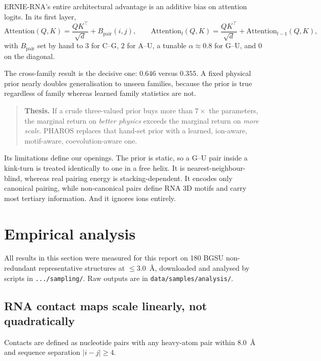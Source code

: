 \documentclass[11pt,a4paper]{article}
\begin{document}
ERNIE-RNA's entire architectural advantage is an additive bias on attention
logits. In its first layer,
\begin{equation}
\mathrm{Attention}(Q,K) = \frac{QK^{\top}}{\sqrt{d}} + B_{\text{pair}}(i,j),
\qquad
\mathrm{Attention}_{l}(Q,K) = \frac{QK^{\top}}{\sqrt{d}} + \mathrm{Attention}_{l-1}(Q,K),
\end{equation}
with $B_{\text{pair}}$ set by hand to $3$ for C--G, $2$ for A--U, a tunable
$\alpha \approx 0.8$ for G--U, and $0$ on the diagonal.

The cross-family result is the decisive one: $0.646$ versus $0.355$. A fixed
physical prior nearly doubles generalisation to unseen families, because the
prior is true regardless of family whereas learned family statistics are not.

\begin{quote}
\textbf{Thesis.} If a crude three-valued prior buys more than $7\times$ the
parameters, the marginal return on \emph{better physics} exceeds the marginal
return on \emph{more scale}. PHAROS replaces that hand-set prior with a learned,
ion-aware, motif-aware, coevolution-aware one.
\end{quote}

Its limitations define our openings. The prior is static, so a G--U pair inside
a kink-turn is treated identically to one in a free helix. It is
nearest-neighbour-blind, whereas real pairing energy is stacking-dependent. It
encodes only canonical pairing, while non-canonical pairs define RNA 3D motifs
and carry most tertiary information. And it ignores ions entirely.

\section{Empirical analysis}

All results in this section were measured for this report on 180 BGSU
non-redundant representative structures at $\leq 3.0$~\AA{}, downloaded and
analysed by scripts in \texttt{.../sampling/}. Raw outputs are in
\texttt{data/samples/analysis/}.

\subsection{RNA contact maps scale linearly, not quadratically}

Contacts are defined as nucleotide pairs with any heavy-atom pair within
$8.0$~\AA{} and sequence separation $|i-j| \geq 4$.
\end{document}
